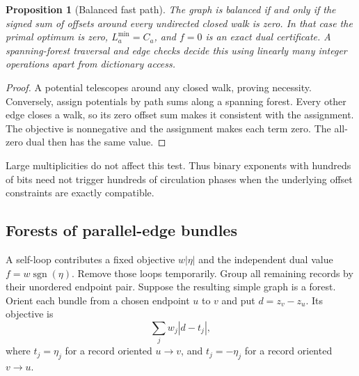 \documentclass[11pt,letterpaper]{article}
\newtheorem{proposition}[theorem]{Proposition}
\theoremstyle{definition}
\theoremstyle{remark}\newtheorem{remark}[theorem]{Remark}
\newcommand{\sgn}{\operatorname{sgn}}
\begin{document}
\begin{proposition}[Balanced fast path]
The graph is balanced if and only if the signed sum of offsets around every
undirected closed walk is zero. In that case the primal optimum is zero,
$L_a^{\min}=C_a$, and $f=0$ is an exact dual certificate. A spanning-forest
traversal and edge checks decide this using linearly many integer operations
apart from dictionary access.
\end{proposition}
\begin{proof}
A potential telescopes around any closed walk, proving necessity. Conversely,
assign potentials by path sums along a spanning forest. Every other edge
closes a walk, so its zero offset sum makes it consistent with the assignment.
The objective is nonnegative and the assignment makes each term zero.
The all-zero dual then has the same value.
\end{proof}

Large multiplicities do not affect this test. Thus binary exponents with
hundreds of bits need not trigger hundreds of circulation phases when the
underlying offset constraints are exactly compatible.

\subsection{Forests of parallel-edge bundles}

A self-loop contributes a fixed objective $w|\eta|$ and the independent dual
value $f=w\sgn(\eta)$. Remove those loops temporarily. Group all remaining
records by their unordered endpoint pair. Suppose the resulting simple graph
is a forest. Orient each bundle from a chosen endpoint $u$ to $v$ and put
$d=z_v-z_u$. Its objective is
\[
 \sum_j w_j|d-t_j|,
\]
where $t_j=\eta_j$ for a record oriented $u\to v$, and
$t_j=-\eta_j$ for a record oriented $v\to u$.
\end{document}
